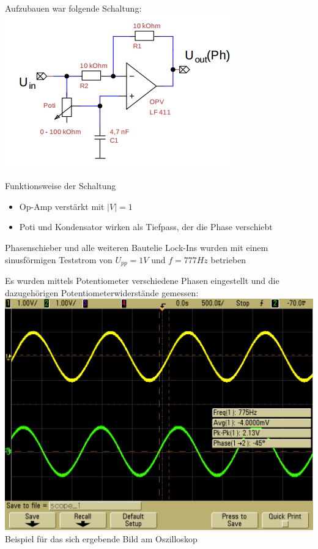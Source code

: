 \documentclass[compress,11pt]{beamer}
\begin{document}
\begin{frame}
Aufzubauen war folgende Schaltung:\\
\includegraphics[width=.7\textwidth]{schalt/phasenschieber}\\

\end{frame}
\begin{frame}
\begin{block}{Funktionsweise der Schaltung}
\begin{itemize}
\item Op-Amp verstärkt mit $|V| = 1$
\item Poti und Kondensator wirken als Tiefpass, der die Phase verschiebt
\end{itemize}
\end{block}
Phasenschieber und alle weiteren Bautelie Lock-Ins wurden mit einem sinusförmigen Teststrom von $U_{pp} = 1 V$ und $f = 777 Hz$ betrieben
\end{frame}
\begin{frame}
Es wurden mittels Potentiometer verschiedene Phasen eingestellt und die dazugehörigen Potentiometerwiderstände gemessen:\\
\includegraphics[width=.7\textwidth]{../oszi/scope_1}\\
Beispiel für das sich ergebende Bild am Oszilloskop

\end{frame}
\end{document}
